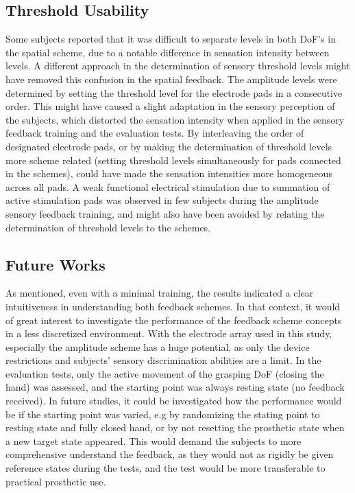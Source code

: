 \subsection{Threshold Usability }
Some subjects reported that it was difficult to separate levels in both DoF's in the spatial scheme, due to a notable difference in sensation intensity between levels. A different approach in the determination of sensory threshold levels might have removed this confusion in the spatial feedback. The amplitude levels were determined by setting the threshold level for the electrode pads in a consecutive order. This might have caused a slight adaptation in the sensory perception of the subjects, which distorted the sensation intensity when applied in the sensory feedback training and the evaluation tests. By interleaving the order of designated electrode pads, or by making the determination of threshold levels more scheme related (setting threshold levels simultaneously for pads connected in the schemes), could have made the sensation intensities more homogeneous across all pads. A weak functional electrical stimulation due to summation of active stimulation pads was observed in few subjects during the amplitude sensory feedback training, and might also have been avoided by relating the determination of threshold levels to the schemes. 

\subsection{Future Works}
As mentioned, even with a minimal training, the results indicated a clear intuitiveness in understanding both feedback schemes. In that context, it would of great interest to investigate the performance of the feedback scheme concepts in a less discretized environment. With the electrode array used in this study, especially the amplitude scheme has a huge potential, as only the device restrictions and subjects' sensory discrimination abilities are a limit.
In the evaluation tests, only the active movement of the grasping DoF (closing the hand) was assessed, and the starting point was always resting state (no feedback received). In future studies, it could be investigated how the performance would be if the starting point was varied, e.g by randomizing the stating point to resting state and fully closed hand, or by not resetting the prosthetic state when a new target state appeared. This would demand the subjects to more comprehensive understand the feedback, as they would not as rigidly be given reference states during the tests, and the test would be more transferable to practical prosthetic use.

